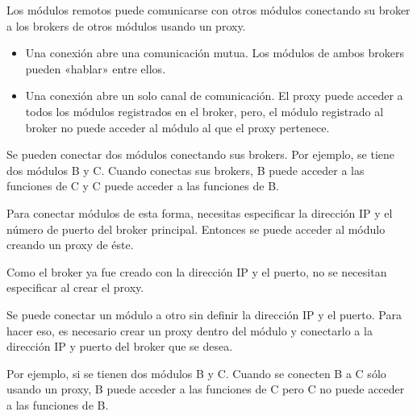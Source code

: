 Los módulos remotos puede comunicarse con otros módulos conectando su broker
a los brokers de otros módulos usando un proxy.
\begin{itemize}
\item {} 
Una conexión  abre una comunicación mutua. Los módulos de ambos brokers pueden «hablar» entre ellos.

\item {} 
Una conexión  abre un solo canal de comunicación. El proxy puede acceder a todos los módulos registrados en el broker, pero, el módulo registrado al broker no puede acceder al módulo al que el proxy pertenece.

\end{itemize}


Se pueden conectar dos módulos conectando sus brokers.
Por ejemplo, se tiene dos módulos B y C. Cuando conectas sus brokers, B puede
acceder  a las funciones de C y C puede acceder a las funciones de B.

Para conectar módulos de esta forma, necesitas especificar la dirección IP y el
número de puerto del broker principal. Entonces se puede acceder al módulo
creando un proxy de éste.

Como el broker ya fue creado con la dirección IP y el puerto, no se necesitan
especificar al crear el proxy.


Se puede conectar un módulo a otro sin definir la dirección IP y el puerto.
Para hacer eso, es necesario crear un proxy dentro del módulo y conectarlo
a la dirección IP y puerto del broker que se desea.

Por ejemplo, si se tienen dos módulos B y C. Cuando se conecten B a C sólo
usando un proxy, B puede acceder a las funciones de C pero C no puede acceder
a las funciones de B.



